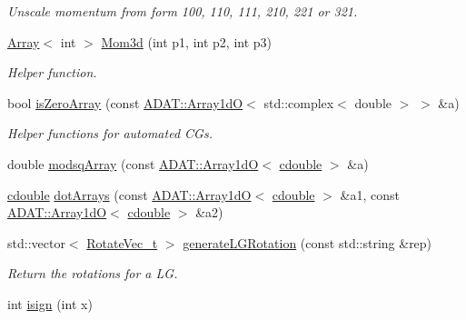 \begin{DoxyCompactItemize}
\begin{DoxyCompactList}\small\item\em Unscale momentum from form 100, 110, 111, 210, 221 or 321. \end{DoxyCompactList}\item 
\mbox{\hyperlink{classXMLArray_1_1Array}{Array}}$<$ int $>$ \mbox{\hyperlink{namespaceHadron_af72905f43cac8c79d2479565a6fe54d3}{Mom3d}} (int p1, int p2, int p3)
\begin{DoxyCompactList}\small\item\em Helper function. \end{DoxyCompactList}\item 
bool \mbox{\hyperlink{namespaceHadron_a4c6b00854fd4dc574c56c8ddfd1a253f}{is\+Zero\+Array}} (const \mbox{\hyperlink{classADAT_1_1Array1dO}{A\+D\+A\+T\+::\+Array1dO}}$<$ std\+::complex$<$ double $>$ $>$ \&a)
\begin{DoxyCompactList}\small\item\em Helper functions for automated C\+Gs. \end{DoxyCompactList}\item 
double \mbox{\hyperlink{namespaceHadron_a05c9899cc82acc7112a4df5dab534ee4}{modsq\+Array}} (const \mbox{\hyperlink{classADAT_1_1Array1dO}{A\+D\+A\+T\+::\+Array1dO}}$<$ \mbox{\hyperlink{namespaceHadron_abaab2f90393b8dd8d93060e6ce6568e7}{cdouble}} $>$ \&a)
\item 
\mbox{\hyperlink{namespaceHadron_abaab2f90393b8dd8d93060e6ce6568e7}{cdouble}} \mbox{\hyperlink{namespaceHadron_aad081d14cd95160e164751fe86cff3af}{dot\+Arrays}} (const \mbox{\hyperlink{classADAT_1_1Array1dO}{A\+D\+A\+T\+::\+Array1dO}}$<$ \mbox{\hyperlink{namespaceHadron_abaab2f90393b8dd8d93060e6ce6568e7}{cdouble}} $>$ \&a1, const \mbox{\hyperlink{classADAT_1_1Array1dO}{A\+D\+A\+T\+::\+Array1dO}}$<$ \mbox{\hyperlink{namespaceHadron_abaab2f90393b8dd8d93060e6ce6568e7}{cdouble}} $>$ \&a2)
\item 
std\+::vector$<$ \mbox{\hyperlink{structHadron_1_1RotateVec__t}{Rotate\+Vec\+\_\+t}} $>$ \mbox{\hyperlink{namespaceHadron_a4467e73143184e2935f0f0f0e31079bc}{generate\+L\+G\+Rotation}} (const std\+::string \&rep)
\begin{DoxyCompactList}\small\item\em Return the rotations for a LG. \end{DoxyCompactList}\item 
int \mbox{\hyperlink{namespaceHadron_ab7c3962155ebb71e6377424d11c29daa}{isign}} (int x)
\item 

\end{DoxyCompactItemize}
